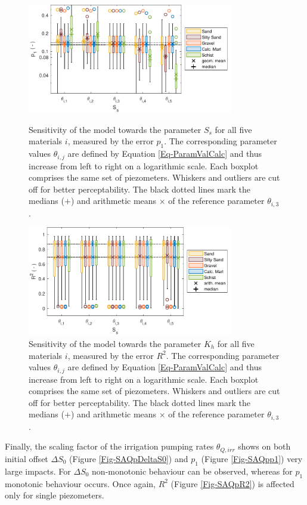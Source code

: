 \begin{figure}[p]
    \centering
    \includegraphics[width=0.8\textwidth]{./img/Fig-SensAna-S_s-p_1.pdf}
    \caption{Sensitivity of the model towards the parameter $S_s$ for all five materials $i$, measured by the error $p_1$. The corresponding parameter values $\theta_{i,j}$ are defined by Equation \eqref{Eq-ParamValCalc} and thus increase from left to right on a logarithmic scale. Each boxplot comprises the same set of piezometers. Whiskers and outliers are cut off for better perceptability. The black dotted lines mark the medians ($\bm{+}$) and arithmetic means $\bm{\times}$ of the reference parameter $\theta_{i,3}$.}
    \label{Fig-SASsp1}
    
    \includegraphics[width=0.8\textwidth]{./img/Fig-SensAna-S_s-R^2.pdf}
    \caption{Sensitivity of the model towards the parameter $K_h$ for all five materials $i$, measured by the error $R^2$. The corresponding parameter values $\theta_{i,j}$ are defined by Equation \eqref{Eq-ParamValCalc} and thus increase from left to right on a logarithmic scale. Each boxplot comprises the same set of piezometers. Whiskers and outliers are cut off for better perceptability. The black dotted lines mark the medians ($\bm{+}$) and arithmetic means $\bm{\times}$ of the reference parameter $\theta_{i,3}$.}
    \label{Fig-SASsR2}
\end{figure}

Finally, the scaling factor of the irrigation pumping rates $\theta_{Q,irr}$ shows on both initial offset $\Delta S_0$ (Figure \ref{Fig-SAQpDeltaS0}) and $p_1$ (Figure \ref{Fig-SAQpp1}) very large impacts. For $\Delta S_0$ non-monotonic behaviour can be observed, whereas for $p_1$ monotonic behaviour occurs. Once again, $R^2$ (Figure \ref{Fig-SAQpR2}) is affected only for single piezometers.

